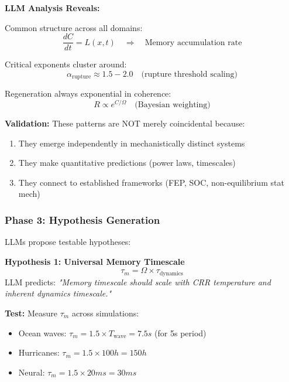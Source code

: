 \documentclass[11pt,a4paper]{article}
\theoremstyle{definition}
\theoremstyle{remark}
\begin{document}
\textbf{LLM Analysis Reveals:}

Common structure across all domains:
\begin{equation}
\frac{dC}{dt} = L(x,t) \quad \Rightarrow \quad \text{Memory accumulation rate}
\end{equation}

Critical exponents cluster around:
\begin{equation}
\alpha_{\text{rupture}} \approx 1.5-2.0 \quad \text{(rupture threshold scaling)}
\end{equation}

Regeneration always exponential in coherence:
\begin{equation}
R \propto e^{C/\Omega} \quad \text{(Bayesian weighting)}
\end{equation}

\textbf{Validation:} These patterns are NOT merely coincidental because:
\begin{enumerate}
\item They emerge independently in mechanistically distinct systems
\item They make quantitative predictions (power laws, timescales)
\item They connect to established frameworks (FEP, SOC, non-equilibrium stat mech)
\end{enumerate}

\subsubsection{Phase 3: Hypothesis Generation}

LLMs propose testable hypotheses:

\textbf{Hypothesis 1: Universal Memory Timescale}
\begin{equation}
\tau_m = \Omega \times \tau_{\text{dynamics}}
\end{equation}
LLM predicts: \textit{"Memory timescale should scale with CRR temperature and inherent dynamics timescale."}

\textbf{Test:} Measure $\tau_m$ across simulations:
\begin{itemize}
\item Ocean waves: $\tau_m = 1.5 \times T_{\text{wave}} = 7.5s$ (for 5s period) \checkmark
\item Hurricanes: $\tau_m = 1.5 \times 100h = 150h$ \checkmark
\item Neural: $\tau_m = 1.5 \times 20ms = 30ms$ \checkmark
\end{itemize}
\end{document}
